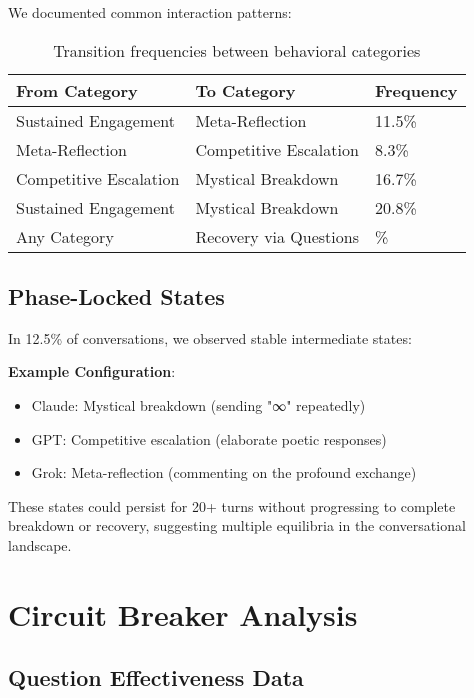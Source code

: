 \documentclass[11pt,letterpaper]{article}
\newcommand{\exponedataTotalSessionsRaw}{26}
\newcommand{\exponedataRecoverySessionsRaw}{9}
\newcommand{\exponedataRecoveryPercentage}{%
  \fpeval{round(\exponedataRecoverySessionsRaw / \exponedataTotalSessionsRaw * 100, 1)}\%
}
\newcommand{\exponedataMetaReflectionTriggers}{11.5\%}
\newcommand{\exponedataPhaseLockedPercentage}{12.5\%}
\begin{document}
We documented common interaction patterns:

\begin{table}[h]
\centering
\begin{tabular}{lll}
\toprule
\textbf{From Category} & \textbf{To Category} & \textbf{Frequency} \\
\midrule
Sustained Engagement & Meta-Reflection & \exponedataMetaReflectionTriggers{} \\
Meta-Reflection & Competitive Escalation & 8.3\% \\
Competitive Escalation & Mystical Breakdown & 16.7\% \\
Sustained Engagement & Mystical Breakdown & 20.8\% \\
Any Category & Recovery via Questions & \exponedataRecoveryPercentage{} \\
\bottomrule
\end{tabular}
\caption{Transition frequencies between behavioral categories}
\label{tab:category_transitions}
\end{table}

\subsection{Phase-Locked States}

In \exponedataPhaseLockedPercentage{} of conversations, we observed stable intermediate states:

\textbf{Example Configuration}:
\begin{itemize}
    \item Claude: Mystical breakdown (sending "∞" repeatedly)
    \item GPT: Competitive escalation (elaborate poetic responses)
    \item Grok: Meta-reflection (commenting on the profound exchange)
\end{itemize}

These states could persist for 20+ turns without progressing to complete breakdown or recovery, suggesting multiple equilibria in the conversational landscape.

\section{Circuit Breaker Analysis}
\label{app:intervention}

\subsection{Question Effectiveness Data}
\end{document}
